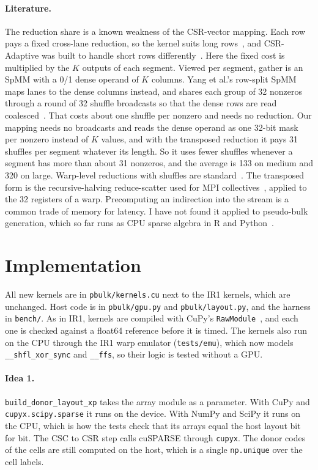 \documentclass[sigconf,nonacm]{acmart}
\newcommand{\code}[1]{\texttt{#1}}
\newcommand{\file}[1]{{\urlstyle{tt}\nolinkurl{#1}}}   %
\begin{document}
\paragraph{Literature.} The reduction share is a known weakness of the CSR-vector mapping. Each row pays a fixed
cross-lane reduction, so the kernel suits long rows~\cite{bell2009}, and CSR-Adaptive was built to
handle short rows differently~\cite{greathouse2014}. Here the fixed cost is multiplied by the $K$
outputs of each segment. Viewed per segment, gather is an SpMM with a 0/1 dense operand of $K$ columns.
Yang et al.'s row-split SpMM maps lanes to the dense columns instead, and shares each group of 32
nonzeros through a round of 32 shuffle broadcasts so that the dense rows are read
coalesced~\cite{yang2018}. That costs about one shuffle per nonzero and needs no reduction. Our mapping needs no broadcasts and reads the dense operand as one 32-bit mask per nonzero instead of
$K$ values, and with the transposed reduction it pays 31 shuffles per segment whatever its length. So it uses fewer shuffles
whenever a segment has more than about 31 nonzeros, and the average is 133 on medium and 320 on large.
Warp-level reductions with shuffles are standard~\cite{cudaguide}. The
transposed form is the recursive-halving reduce-scatter used for MPI collectives~\cite{thakur2005},
applied to the 32 registers of a warp. Precomputing an indirection into the stream is a common
trade of memory for latency. I have not found it applied to pseudo-bulk generation, which so far runs
as CPU sparse algebra in R and Python~\cite{crowell2020,squair2021}.

\section{Implementation}
\label{sec:impl}

All new kernels are in \file{pbulk/kernels.cu} next to the IR1 kernels, which are unchanged. Host code is
in \file{pbulk/gpu.py} and \file{pbulk/layout.py}, and the harness in \file{bench/}. As in IR1, kernels
are compiled with CuPy's \code{RawModule}~\cite{okuta2017}, and each one is checked against a float64
reference before it is timed. The kernels also run on the CPU through the IR1 warp emulator
(\file{tests/emu}), which now models \code{\_\_shfl\_xor\_sync} and \code{\_\_ffs}, so their logic is
tested without a GPU.

\paragraph{Idea 1.} \code{build\_donor\_layout\_xp} takes the array module as a parameter. With CuPy
and \code{cupyx.scipy.sparse} it runs on the device. With NumPy and SciPy it runs on the CPU, which is how
the tests check that its arrays equal the host layout bit for bit. The CSC to CSR step calls cuSPARSE
through \code{cupyx}. The donor codes of the cells are still computed on the host, which is a single
\code{np.unique} over the cell labels.
\end{document}
